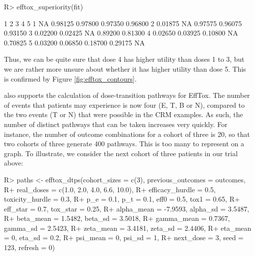 \documentclass[article]{jss}
\begin{document}
\begin{CodeChunk}

\begin{CodeInput}
R> efftox_superiority(fit)
\end{CodeInput}

\begin{CodeOutput}
        1       2       3       4       5
1      NA 0.98125 0.97800 0.97350 0.96800
2 0.01875      NA 0.97575 0.96075 0.93150
3 0.02200 0.02425      NA 0.89200 0.81300
4 0.02650 0.03925 0.10800      NA 0.70825
5 0.03200 0.06850 0.18700 0.29175      NA
\end{CodeOutput}
\end{CodeChunk}

Thus, we can be quite sure that dose 4 has higher utility than doses 1
to 3, but we are rather more unsure about whether it has higher utility
than dose 5. This is confirmed by Figure \ref{fig:efftox_contours}.

 also supports the calculation of dose-transition pathways
for EffTox. The number of events that patients may experience is now
four (E, T, B or N), compared to the two events (T or N) that were
possible in the CRM examples. As such, the number of distinct pathways
that can be taken increases very quickly. For instance, the number of
outcome combinations for a cohort of three is 20, so that two cohorts of
three generate 400 pathways. This is too many to represent on a graph.
To illustrate, we consider the next cohort of three patients in our
trial above:

\begin{CodeChunk}

\begin{CodeInput}
R> paths <- efftox_dtps(cohort_sizes = c(3), previous_outcomes = outcomes, 
R+                      real_doses = c(1.0, 2.0, 4.0, 6.6, 10.0),
R+                      efficacy_hurdle = 0.5, toxicity_hurdle = 0.3,
R+                      p_e = 0.1, p_t = 0.1, eff0 = 0.5, tox1 = 0.65,
R+                      eff_star = 0.7, tox_star = 0.25,
R+                      alpha_mean = -7.9593, alpha_sd = 3.5487,
R+                      beta_mean = 1.5482, beta_sd = 3.5018,
R+                      gamma_mean = 0.7367, gamma_sd = 2.5423,
R+                      zeta_mean = 3.4181, zeta_sd = 2.4406,
R+                      eta_mean = 0, eta_sd = 0.2,
R+                      psi_mean = 0, psi_sd = 1, 
R+                      next_dose = 3, seed = 123, refresh = 0)
\end{CodeInput}
\end{CodeChunk}
\end{document}
